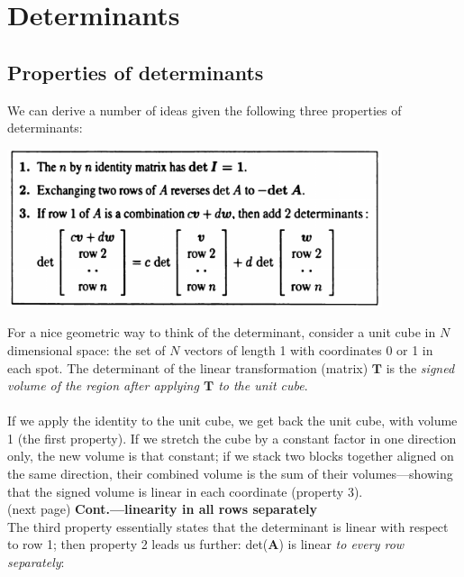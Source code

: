 \documentclass{report}
\begin{document}
\newpage

\chapter{Determinants}
\section{Properties of determinants}
We can derive a number of ideas given the following three properties of determinants:
\begin{center}
\includegraphics[width=11cm]{94}
\end{center}
For a nice geometric way to think of the determinant, consider a unit cube in $N$ dimensional space: the set of $N$ vectors of length 1 with coordinates 0 or 1 
in each spot. The determinant of the linear transformation (matrix) $\bm T$ is the \textit{signed volume of the region after applying $\bm T$ to the unit cube}.\\
\vspace{1mm}\\
If we apply the identity to the unit cube, we get back the unit cube, with volume 1 (the first property). If we stretch the cube by a constant factor in one direction only, 
the new volume is that constant; if we stack two blocks together aligned on the same direction, their combined volume is the sum of their volumes---showing that the signed 
volume is linear in each coordinate (property 3).\\
(next page)\newpage
\noindent\textbf{Cont.---linearity in all rows separately}\\
The third property essentially states that the determinant is linear with respect to row 1; then property 2 leads us further: det($\bm A$) is linear \textit{to every row 
separately}:
\end{document}
